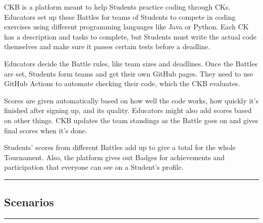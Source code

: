 \documentclass{Configuration_Files/Template}
\begin{document}
CKB is a platform meant to help Students practice coding through CKs. Educators set up these Battles for teams of Students to compete in coding exercises using different programming languages like Java or Python. Each CK has a description and tasks to complete, but Students must write the actual code themselves and make sure it passes certain tests before a deadline.

Educators decide the Battle rules, like team sizes and deadlines. Once the Battles are set, Students form teams and get their own GitHub pages. They need to use GitHub Actions to automate checking their code, which the CKB evaluates.

Scores are given automatically based on how well the code works, how quickly it's finished after signing up, and its quality. Educators might also add scores based on other things. CKB updates the team standings as the Battle goes on and gives final scores when it's done.

Students' scores from different Battles add up to give a total for the whole Tournament. Also, the platform gives out Badges for achievements and participation that everyone can see on a Student's profile.

{\color{bluepoli}\rule{\linewidth}{0.1pt}}

\subsection{Scenarios}

{\color{bluepoli}\rule{\linewidth}{0.1pt}}
\end{document}
